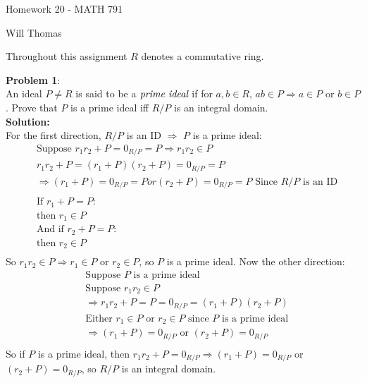 \documentclass[11pt]{article}
\newcommand{\prob}[3]{\begin{flushleft}
        \textbf{Problem #1}: \\
        #2 
		\textbf{Solution:} 
		#3

\end{flushleft}}
\newcommand{\makeHWtitle}[1]{
    \begin{center}
    \Large{Homework #1 - MATH 791} 
        \vspace{5pt}
        
        \normalsize{Will Thomas}
        \vspace{5pt}
    \end{center}
}
\begin{document}
\makeHWtitle{20}
Throughout this assignment $R$ denotes a commutative ring.

\prob{1}{
An ideal $P \neq R$ is said to be a $\emph{prime ideal}$ if for $a, b \in R$, $ab \in P \Rightarrow a \in P $ or $b \in P$. Prove that $P$ is a prime ideal iff $R/P$ is an integral domain.\\
}
{\\
For the first direction, $R/P$ is an ID $\Rightarrow$ $P$ is a prime ideal:
\begin{align*}
&\text{Suppose } r_1r_2 + P = 0_{R/P} = P \Rightarrow r_1r_2 \in P\\
&r_1r_2 + P = (r_1 + P)(r_2 + P) = 0_{R/P} = P \\
&\Rightarrow (r_1 + P) = 0_{R/P} = P or (r_2 + P) = 0_{R/P} = P \text{ Since $R/P$ is an ID}\\ 
&\\
&\text{If $r_1 + P = P$}:\\
&\text{then } r_1 \in P\\
&\text{And if $r_2 + P = P$}:\\
&\text{then } r_2 \in P\\
\end{align*}
So $r_1r_2 \in P \Rightarrow r_1 \in P$ or $r_2 \in P$, so $P$ is a prime ideal. Now the other direction:
\begin{align*}
&\text{Suppose $P$ is a prime ideal}\\
&\text{Suppose $r_1r_2 \in P$}\\
&\Rightarrow r_1r_2 + P = P = 0_{R/P} = (r_1 + P)(r_2 + P)\\
&\text{Either $r_1 \in P$ or $r_2 \in P$ since $P$ is a prime ideal}\\
&\Rightarrow (r_1 + P) = 0_{R/P} \text{ or } (r_2 + P) = 0_{R/P}\\
\end{align*}
So if $P$ is a prime ideal, then $r_1r_2 + P = 0_{R/P} \Rightarrow (r_1 + P) = 0_{R/P} $ or $(r_2 + P) = 0_{R/P}$, so $R/P$ is an integral domain.
}
\end{document}
